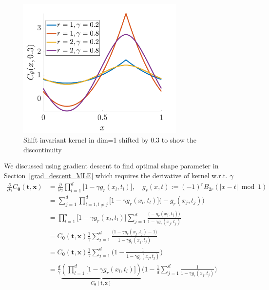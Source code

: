 \documentclass{iitthesis}          %
\newcommand{\bm}[1]{\boldsymbol{#1}}
\newcommand{\vtheta}{{\bm{\theta}}}
\newcommand{\vt}{\bm{t}}
\newcommand{\vx}{\bm{x}}
\newcommand\secref{Section~\ref}
\begin{document}
\begin{figure}
	\centering
	\includegraphics[height=7cm]{"figures/fourier_kernel dim_1"}
	\caption[Fourier kernel]{Shift invariant kernel in dim=1 shifted by 0.3 to show the discontinuity }
	\label{fig:fourierkernel-dim1}
\end{figure}

\label{sec:deriv_of_kernel}
We discussed using gradient descent to find optimal shape parameter in  \secref{grad_descent_MLE} which requires the derivative of kernel w.r.t. $\gamma$
\begin{align*}
\frac{\partial}{\partial \gamma} C_\vtheta(\vt, \vx) 
& =
\frac{\partial}{\partial \gamma} 
\prod_{l=1}^d \biggl[
1 - \gamma g_r(x_l,t_l) \biggr], \quad  g_r(x,t) := (-1)^{r} B_{2r}( |{x-t}| \bmod 1 ) 
\\
& = 
\sum_{j=1}^d  
\prod_{l=1, l \neq j}^d \biggl[
1 - \gamma g_r(x_l,t_l) \biggr]
\biggl( - g_r(x_j,t_j) \biggr)
\\
& =
\prod_{l=1}^d \biggl[
1 - \gamma g_r(x_l,t_l) \biggr]
\sum_{j=1}^d 
\frac{
	\biggl( - g_r(x_j,t_j) \biggr)
}{
	1 - \gamma g_r(x_j,t_j) 
}
\\
& =
C_\vtheta(\vt, \vx) 
\frac{1}{\gamma}
\sum_{j=1}^d 
\frac{
	\biggl(1 - \gamma g_r({x_j,t_j})  - 1 \biggr)
}{
	1 - \gamma g_r(x_j,t_j) 
}
\\
& =
C_\vtheta(\vt, \vx) 
\frac{1}{\gamma}
\sum_{j=1}^d 
\biggl(
1 - 
\frac{1
}{
	1 - \gamma g_r(x_j,t_j) 
}
\biggr)
\\
& =
\frac{d}{\gamma} 
\underbrace{
	\left(
	\prod_{l=1}^d \biggl[
	1 - \gamma g_r(x_l,t_l) \biggr]
	\right) }_
{ C_\vtheta(\vt, \vx) }
\biggl(
1 - 
\frac{1}{d} \sum_{j=1}^d
\frac{1}
{ 1 - \gamma g_r(x_j,t_j) }
\biggr)
\end{align*}
\end{document}

